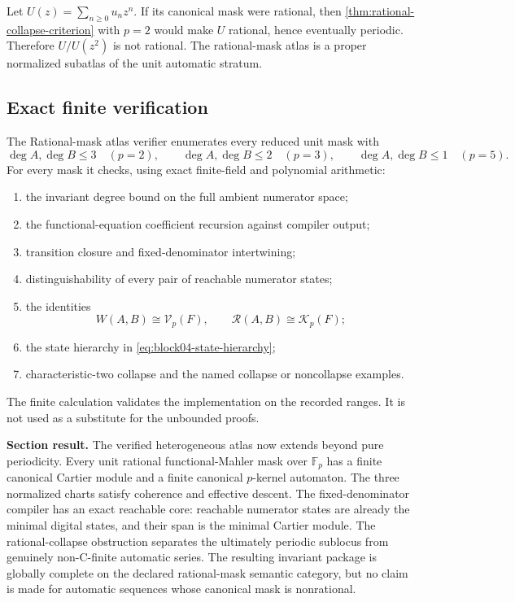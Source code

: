 \documentclass[11pt]{article}
\theoremstyle{definition}
\theoremstyle{remark}
\begin{document}
Let \(U(z)=\sum_{n\geq0}u_nz^n\).  If its canonical mask were rational, then \cref{thm:rational-collapse-criterion} with \(p=2\) would make \(U\) rational, hence eventually periodic.  Therefore \(U/U(z^2)\) is not rational.  The rational-mask atlas is a proper normalized subatlas of the unit automatic stratum.

\subsection{Exact finite verification}



The Rational-mask atlas verifier enumerates every reduced unit mask with
\[
\deg A,\deg B\leq3\quad(p=2),
\qquad
\deg A,\deg B\leq2\quad(p=3),
\qquad
\deg A,\deg B\leq1\quad(p=5).
\]
For every mask it checks, using exact finite-field and polynomial arithmetic:
\begin{enumerate}
\item the invariant degree bound on the full ambient numerator space;
\item the functional-equation coefficient recursion against compiler output;
\item transition closure and fixed-denominator intertwining;
\item distinguishability of every pair of reachable numerator states;
\item the identities
\[
W(A,B)\cong\mathcal V_p(F),
\qquad
\mathcal R(A,B)\cong\mathcal K_p(F);
\]
\item the state hierarchy in \cref{eq:block04-state-hierarchy};
\item characteristic-two collapse and the named collapse or noncollapse examples.
\end{enumerate}
The finite calculation validates the implementation on the recorded ranges.  It is not used as a substitute for the unbounded proofs.

\begin{resultbox}
\textbf{Section result.}
The verified heterogeneous atlas now extends beyond pure periodicity.  Every unit rational functional-Mahler mask over \(\mathbb F_p\) has a finite canonical Cartier module and a finite canonical \(p\)-kernel automaton.  The three normalized charts satisfy coherence and effective descent.  The fixed-denominator compiler has an exact reachable core: reachable numerator states are already the minimal digital states, and their span is the minimal Cartier module.  The rational-collapse obstruction separates the ultimately periodic sublocus from genuinely non-C-finite automatic series.  The resulting invariant package is globally complete on the declared rational-mask semantic category, but no claim is made for automatic sequences whose canonical mask is nonrational.
\end{resultbox}
\end{document}
